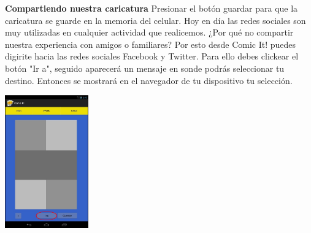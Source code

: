 \documentclass[12pt]{report}
\begin{document}


\begingroup
		\large{
			\textbf{
				Compartiendo nuestra caricatura
				\newline
				\newline
			}
		}
	\endgroup
Presionar el botón guardar para que la caricatura se guarde en la memoria del celular.
Hoy en día las redes sociales son muy utilizadas en cualquier actividad que realicemos. ¿Por qué no compartir nuestra experiencia con amigos o familiares?
Por esto desde Comic It! puedes digirite hacia las redes sociales Facebook y Twitter. Para ello debes clickear el botón "Ir a", seguido aparecerá un mensaje en sonde podrás seleccionar tu destino. Entonces se mostrará en el navegador de tu dispositivo tu selección.
\newline

	\begin{center}
		\begingroup
			\includegraphics[width=0.27\textwidth]{imagenes_usuario/ir_a.jpg}
		\endgroup
	\end{center}
\end{document}
